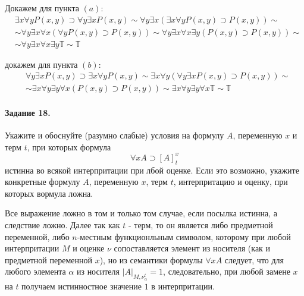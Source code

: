 \documentclass[a4paper,12pt]{article}
\begin{document}
\begin{Solution}
Докажем для пункта $(a)$:
\[
	\begin{split}
		& \exists x \forall y P\left(x,y\right) \supset \forall y \exists x P\left(x,y\right) \sim \forall y \exists x \left(\exists x \forall y P\left(x,y\right) \supset P\left(x,y\right)\right) \sim \\
		& \sim \forall y \exists x \forall x \left(\forall y P\left(x,y\right) \supset P\left(x,y\right)\right) \sim \forall y \exists x \forall x \exists y \left(P\left(x,y\right) \supset P\left(x,y\right)\right) \sim \\
		& \sim \forall y \exists x \forall x \exists y \mathbb{T} \sim \mathbb{T}
	\end{split}
\]

докажем для пункта $(b)$:
\[
	\begin{split}
		& \forall y \exists x P\left(x,y\right) \supset \exists x \forall y P\left(x,y\right) \sim \exists x \forall y \left(\forall y \exists x P\left(x,y\right) \supset P\left(x,y\right)\right) \sim \\
		& \sim \exists x \forall y \exists y \forall x \left(P\left(x,y\right) \supset P\left(x,y\right)\right) \sim \exists x \forall y \exists y \forall x \mathbb{T} \sim \mathbb{T}
	\end{split}
\]
\end{Solution}

\paragraph{Задание 18.} Укажите и обоснуйте (разумно слабые) условия на формулу $A$, переменную $x$ и терм $t$, при которых формула
\[
	\forall x A \supset \left[A\right]_{t}^{x}
\]
истинна во всякой интерпритации при лбой оценке. Если это возможно, укажите конкретные формулу $A$, переменную $x$, терм $t$, интерпритацию и оценку, при которых вормула ложна.

\begin{Solution}
Все выражение ложно в том и только том случае, если посылка истинна, а следствие ложно. Далее так как $t$ - терм, то он является либо предметной переменной, либо $n$-местным функционльным символом, которому при любой интерпритации $M$ и оценке $\nu$ сопоставляется элемент из носителя (как и предметной переменной $x$), но из семантики формулы $\forall x A$ следует, что для любого элемента $\alpha$ из носителя $\left|A\right|_{M,\nu_{\alpha}^{t}} = 1$, следовательно, при любой замене $x$ на $t$ получаем истинностное значение $1$ в интерпритации.
\end{Solution}
\end{document}
